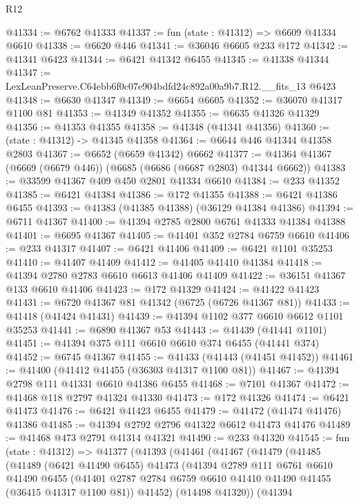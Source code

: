 \begin{lexlean}{R12}
\begin{coremodule}
@41334 := @6762 @41333
@41337 := fun (state : @41312) => @6609 @41334 @6610
@41338 := @6620 @446
@41341 := @36046 @6605 @233 @172
@41342 := @41341 @6423
@41344 := @6421 @41342 @6455
@41345 := @41338 @41344
@41347 := LexLeanPreserve.C64ebb6f0c07e904bdfd24c892a00a9b7.R12.__fits_13 @6423
@41348 := @6630 @41347
@41349 := @6654 @6605
@41352 := @36070 @41317 @1100 @81
@41353 := @41349 @41352
@41355 := @6635 @41326 @41329
@41356 := @41353 @41355
@41358 := @41348 (@41341 @41356)
@41360 := (state : @41312) -> @41345 @41358
@41364 := @6644 @446 @41344 @41358 @2803
@41367 := @6652 (@6659 @41342) @6662
@41377 := @41364 @41367 (@6669 (@6679 @446)) (@6685 (@6686 (@6687 @2803) @41344 @6662))
@41383 := @33599 @41367 @409 @450 @2801 @41334 @6610
@41384 := @233 @41352
@41385 := @6421 @41384
@41386 := @172 @41355
@41388 := @6421 @41386 @6455
@41393 := @41383 (@41385 @41388) (@36129 @41384 @41386)
@41394 := @6711 @41367
@41400 := @41394 @2785 @2800 @6761 @41333 @41384 @41388
@41401 := @6695 @41367
@41405 := @41401 @352 @2784 @6759 @6610
@41406 := @233 @41317
@41407 := @6421 @41406
@41409 := @6421 @1101 @35253
@41410 := @41407 @41409
@41412 := @41405 @41410 @41384
@41418 := @41394 @2780 @2783 @6610 @6613 @41406 @41409
@41422 := @36151 @41367 @133 @6610 @41406
@41423 := @172 @41329
@41424 := @41422 @41423
@41431 := @6720 @41367 @81 @41342 (@6725 (@6726 @41367 @81))
@41433 := @41418 (@41424 @41431)
@41439 := @41394 @1102 @377 @6610 @6612 @1101 @35253
@41441 := @6890 @41367 @53
@41443 := @41439 (@41441 @1101)
@41451 := @41394 @375 @111 @6610 @6610 @374 @6455 (@41441 @374)
@41452 := @6745 @41367
@41455 := @41433 (@41443 (@41451 @41452))
@41461 := @41400 (@41412 @41455 (@36303 @41317 @1100 @81))
@41467 := @41394 @2798 @111 @41331 @6610 @41386 @6455
@41468 := @7101 @41367
@41472 := @41468 @118 @2797 @41324 @41330
@41473 := @172 @41326
@41474 := @6421 @41473
@41476 := @6421 @41423 @6455
@41479 := @41472 (@41474 @41476) @41386
@41485 := @41394 @2792 @2796 @41322 @6612 @41473 @41476
@41489 := @41468 @473 @2791 @41314 @41321
@41490 := @233 @41320
@41545 := fun (state : @41312) =>
  @41377
    (@41393
      (@41461
        (@41467
          (@41479
            (@41485
              (@41489
                (@6421 @41490 @6455)
                @41473
                (@41394
                  @2789
                  @111
                  @6761
                  @6610
                  @41490
                  @6455
                  (@41401 @2787 @2784 @6759 @6610 @41410 @41490 @41455 (@36415 @41317 @1100 @81))
                  @41452)
                (@14498 @41320))
              (@41394

\end{coremodule}
\end{lexlean}
